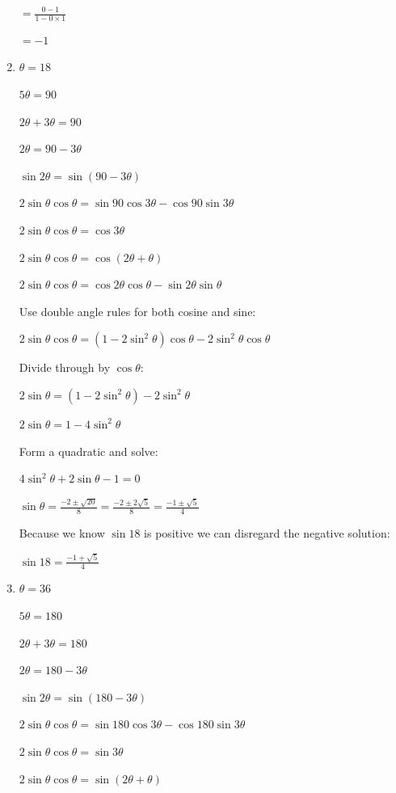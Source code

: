 \documentclass[../main.tex]{subfiles}
\begin{document}
\begin{enumerate}[itemsep=0.4cm]
    $=\frac{0-1}{1-0\times 1}$

    $=-1$

    \item 
    $\theta = 18$

    $5\theta = 90$

    $2\theta +3\theta = 90$

    $2\theta = 90 - 3\theta$

    $\sin{2\theta}=\sin{(90 - 3\theta)}$

    $2\sin{\theta}\cos{\theta}=\sin{90}\cos{3\theta}-\cos{90}\sin{3\theta}$

    $2\sin{\theta}\cos{\theta}=\cos{3\theta}$

    $2\sin{\theta}\cos{\theta}=\cos{(2\theta + \theta)}$

    $2\sin{\theta}\cos{\theta}=\cos{2\theta}\cos{\theta}-\sin{2\theta}\sin{\theta}$

    Use double angle rules for both cosine and sine:

    $2\sin{\theta}\cos{\theta}=(1-2\sin^2{\theta})\cos{\theta}-2\sin^2{\theta}\cos{\theta}$

    Divide through by $\cos{\theta}$:

    $2\sin{\theta}=(1-2\sin^2{\theta})-2\sin^2{\theta}$

    $2\sin{\theta}=1-4\sin^2{\theta}$

    Form a quadratic and solve:

    $4\sin^2{\theta}+2\sin{\theta}-1=0$

    $\sin{\theta}=\frac{-2\pm \sqrt{20}}{8}=\frac{-2\pm 2\sqrt{5}}{8}=\frac{-1\pm \sqrt{5}}{4}$

    Because we know $\sin{18}$ is positive we can disregard the negative solution:

    $\sin{18}=\frac{-1+\sqrt{5}}{4}$

    \item 
    $\theta = 36$

    $5\theta = 180$

    $2\theta + 3\theta = 180$

    $2\theta = 180 - 3\theta$

    $\sin{2\theta} = \sin{(180-3\theta)}$

    $2\sin{\theta}\cos{\theta}=\sin{180}\cos{3\theta}-\cos{180}\sin{3\theta}$

    $2\sin{\theta}\cos{\theta}=\sin{3\theta}$

    $2\sin{\theta}\cos{\theta}=\sin{(2\theta+\theta)}$


\end{enumerate}
\end{document}
